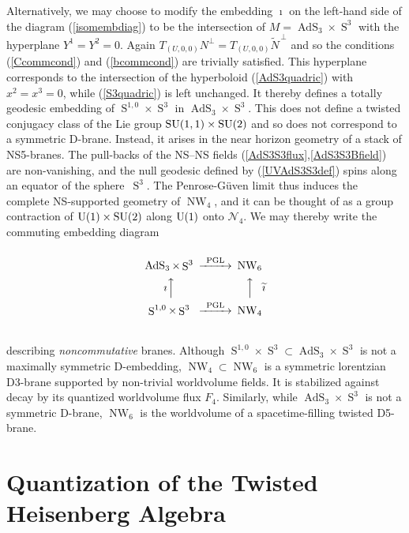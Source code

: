 \documentclass[11pt,a4paper]{article}
\DeclareMathOperator{\AdS}{AdS}
\DeclareMathOperator{\Sphere}{S}
\DeclareMathOperator{\NW}{NW}
\let\S\Sphere
\newcommand{\newsection}{\setcounter{equation}{0}\section}
\begin{document}
Alternatively, we may choose to modify the embedding $\imath$ on the
left-hand side of the diagram (\ref{isomembdiag}) to be the
intersection of $M=\AdS_3\times\S^3$ with the hyperplane
$Y^1=Y^2=0$. Again
$T_{(U,0,0)}N^\perp=T_{(U,0,0)}\widetilde{N}^{\,\perp}$ and so the
conditions (\ref{Ccommcond}) and (\ref{bcommcond}) are trivially
satisfied. This hyperplane corresponds to the intersection of the
hyperboloid (\ref{AdS3quadric}) with $x^2=x^3=0$, while
(\ref{S3quadric}) is left unchanged. It thereby defines a totally
geodesic embedding of $\S^{1,0}\times\S^3$ in
$\AdS_3\times\S^3$. This does not define a twisted conjugacy class of
the Lie group ${\rm SU}(1,1)\times{\rm SU}(2)$ and so does not
correspond to a symmetric D-brane. Instead, it arises in the near
horizon geometry of a stack of NS5-branes. The pull-backs of the NS--NS fields
(\ref{AdS3S3flux},\ref{AdS3S3Bfield}) are non-vanishing, and the null
geodesic defined by (\ref{UVAdS3S3def}) spins along an equator of the
sphere~$\S^3$. The Penrose-G\"uven limit thus induces the complete
NS-supported geometry of $\NW_4$, and it can be thought of as a group
contraction of ${\rm U}(1)\times{\rm SU}(2)$ along ${\rm U}(1)$ onto
$\mathcal{N}_4$. We may thereby write the commuting embedding diagram
\begin{equation}
  \label{NW4commdiag}
  \begin{CD}
    @.\\
    \AdS_3 \times \S^3             @>\text{PGL}>> \NW_6\\
    \text{$\imath$}@AAA @AAA\text{$\widetilde{\imath}$}\\
    \S^{1,0}\times\S^3         @>\text{PGL}>> \NW_4\\
    @.
  \end{CD}
\end{equation}
describing {\it noncommutative} branes. Although
$\S^{1,0}\times\S^3\subset\AdS_3\times\S^3$ is not a maximally
symmetric D-embedding, $\NW_4\subset\NW_6$ is a symmetric lorentzian
D3-brane supported by non-trivial worldvolume fields. It is stabilized
against decay by its quantized worldvolume flux $F_4$. Similarly,
while $\AdS_3\times\S^3$ is not a symmetric D-brane, $\NW_6$ is the
worldvolume of a spacetime-filling twisted D5-brane.

\newsection{Quantization of the Twisted Heisenberg Algebra
  \label{QNWA}}
\end{document}
